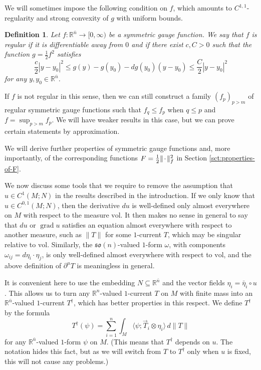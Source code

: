 \documentclass[10pt,a4paper]{amsart}
\newcommand{\R}{\mathbb{R}}
\newcommand{\vol}{\mathrm{vol}}
\newcommand{\ndim}{{\bar{n}}}
\DeclareMathOperator{\grad}{grad}
\newcommand{\blank}{{\mkern 2mu\cdot\mkern 2mu}}
\newcommand{\so}{\mathfrak{so}}
\newcommand{\pairing}[2]{\langle #1; #2 \rangle}
\newtheorem{definition}[theorem]{Definition}
\begin{document}
We will sometimes impose the following condition on $f$, which amounts to
$C^{1, 1}$-regularity and strong convexity of $g$ with uniform bounds.

\begin{definition} \label{def:regular}
Let $f \colon \R^\ndim \to [0, \infty)$ be a symmetric gauge function.
We say that $f$ is \emph{regular} if it is
differentiable away from $0$ and if there exist $c, C > 0$ such that the function $g = \frac{1}{2} f^2$ satisfies
\begin{equation} \label{eq:Hessian-estimate-g}
\frac{c}{2} |y - y_0|^2 \le g(y) - g(y_0) - dg(y_0)(y - y_0) \le \frac{C}{2} |y - y_0|^2
\end{equation}
for any $y, y_0 \in \R^\ndim$.
\end{definition}

If $f$ is not regular in this sense, then we can still construct
a family $(f_p)_{p > m}$ of regular symmetric gauge functions such that $f_q \le f_p$ when $q \le p$ and $f = \sup_{p > m} f_p$.
We will have weaker results in this case, but we can prove certain
statements by approximation.

We will derive further properties of symmetric gauge functions and, more importantly, of the corresponding functions $F = \frac{1}{2}\|\blank\|_f^2$ in Section \ref{sct:properties-of-F}.

We now discuss some tools that we require to remove the assumption that
$u \in C^1(M; N)$ in the results
described in the introduction. If we only know that $u \in C^{0, 1}(M; N)$, then the derivative $du$ is well-defined only almost everywhere on $M$ with respect to the measure $\vol$. It then makes no sense in general to say that $du$
or $\grad u$ satisfies an equation
almost everywhere with respect to another measure, such as $\|T\|$ for some $1$-current $T$, which may be singular relative to $\vol$.
Similarly, the $\so(n)$-valued $1$-form $\omega$, with components $\omega_{ij} = d\eta_i \cdot \eta_j$, is only well-defined almost everywhere with respect to $\vol$, and the above definition of $\partial^u T$ is meaningless in general.

It is convenient here to use the embedding $N \subseteq \R^\ndim$ and the vector fields $\eta_i = \bar{\eta}_i \circ u$.
This allows us to turn any $\R^n$-valued $1$-current $T$ on $M$ with finite mass
into an $\R^\ndim$-valued $1$-current $T^\dagger$, which has better properties in this respect. We define $T^\dagger$ by the formula
\[
T^\dagger(\psi) = \sum_{i = 1}^n \int_M \pairing{\psi}{\vec{T}_i \otimes \eta_i} \, d\|T\|
\]
for any $\R^\ndim$-valued $1$-form $\psi$ on $M$. (This means that $T^\dagger$ depends on $u$. The notation hides this fact, but as we will switch from $T$ to $T^\dagger$ only when $u$ is fixed, this will not cause any problems.)
\end{document}
